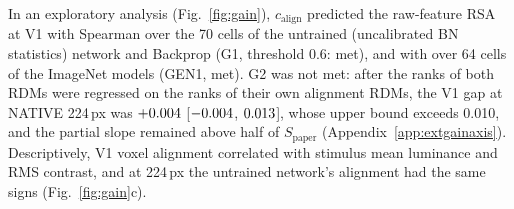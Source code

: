 In an exploratory analysis (Fig.~\ref{fig:gain}), $c_{\mathrm{align}}$ predicted the raw-feature
RSA at V1 with Spearman \GOneSpearman{} over the 70 cells of the untrained (uncalibrated BN
statistics) network and Backprop (G1, threshold 0.6: met), and with \GenOneSpearman{} over 64 cells of the ImageNet models (GEN1, met).
G2 was not met: after the ranks of both RDMs were regressed on the ranks of their own alignment
RDMs, the V1 gap at NATIVE 224\,px was $+0.004$ [$-0.004$,
$0.013$], whose upper bound exceeds 0.010, and the partial slope remained above half of
$S_{\mathrm{paper}}$ (Appendix~\ref{app:extgainaxis}). Descriptively, V1 voxel alignment
correlated with stimulus mean luminance and RMS contrast, and at 224\,px the untrained network's
alignment had the same signs (Fig.~\ref{fig:gain}c).
